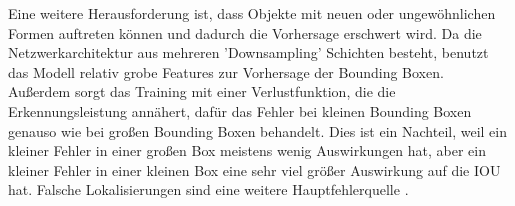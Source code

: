 {{	Eine weitere Herausforderung ist, dass Objekte mit neuen oder ungewöhnlichen Formen auftreten können und dadurch die Vorhersage erschwert wird. Da die Netzwerkarchitektur aus mehreren 'Downsampling' Schichten besteht, benutzt das Modell relativ grobe Features zur Vorhersage der Bounding Boxen. \\ Außerdem sorgt das Training mit einer Verlustfunktion, die die Erkennungsleistung annähert, dafür das Fehler bei kleinen Bounding Boxen genauso wie bei großen Bounding Boxen behandelt. Dies ist ein Nachteil, weil ein kleiner Fehler in einer großen Box meistens wenig Auswirkungen hat, aber ein kleiner Fehler in einer kleinen Box eine sehr viel größer Auswirkung auf die IOU hat. Falsche Lokalisierungen sind eine weitere Hauptfehlerquelle \citep{Plastiras2018}.




	



	} 
	
}



